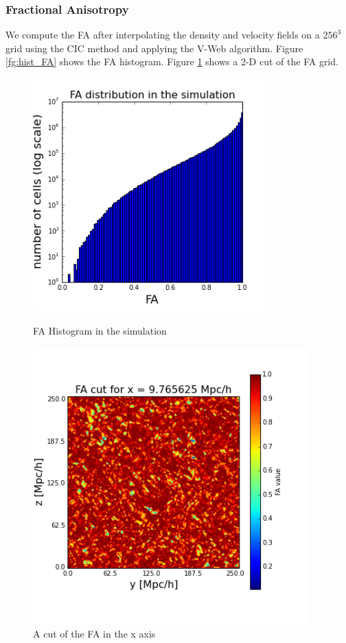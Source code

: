 \documentclass[12pt]{article}
\begin{document}
\subsubsection{Fractional Anisotropy}
 We compute the FA after interpolating the density and velocity fields on a $256^{3}$
   grid using the CIC method and applying the V-Web algorithm. Figure \ref{fg:hist_FA} shows the FA histogram. Figure
      \ref{fg:cut_FA} shows a 2-D cut of the FA grid.
\begin{figure}[ht]
\centering
\begin{minipage}{.5\textwidth}
  \centering
  \includegraphics[width=0.8\textwidth]{simulation/FA_hist_sim.png}
  \caption{FA Histogram in the simulation}
\label{fg:hist_FA}
\end{minipage}%
\begin{minipage}{.5\textwidth}
  \centering
  \includegraphics[width=0.95\textwidth]{simulation/FA_cut_i_10.png}
  \caption{A cut of the FA in the x axis}
\label{fg:cut_FA}
\end{minipage}
\end{figure}
\FloatBarrier
\end{document}
